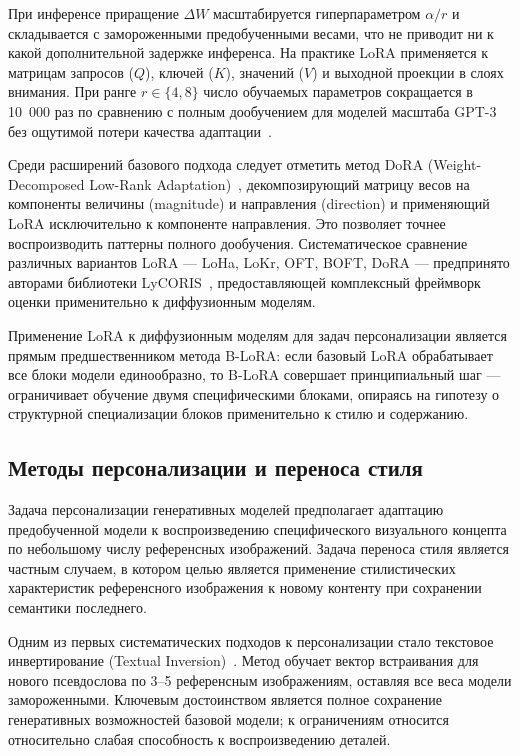 При инференсе приращение $\Delta W$ масштабируется гиперпараметром $\alpha / r$ и складывается с замороженными предобученными весами, что не приводит ни к какой дополнительной задержке инференса. На практике LoRA применяется к матрицам запросов ($Q$), ключей ($K$), значений ($V$) и выходной проекции в слоях внимания. При ранге $r \in \{4, 8\}$ число обучаемых параметров сокращается в 10~000 раз по сравнению с полным дообучением для моделей масштаба GPT-3 без ощутимой потери качества адаптации~\cite{hu2022lora}.

Среди расширений базового подхода следует отметить метод DoRA (Weight-Decomposed Low-Rank Adaptation)~\cite{liu2024dora}, декомпозирующий матрицу весов на компоненты величины (magnitude) и направления (direction) и применяющий LoRA исключительно к компоненте направления. Это позволяет точнее воспроизводить паттерны полного дообучения. Систематическое сравнение различных вариантов LoRA --- LoHa, LoKr, OFT, BOFT, DoRA --- предпринято авторами библиотеки LyCORIS~\cite{yeh2024lycoris}, предоставляющей комплексный фреймворк оценки применительно к диффузионным моделям.

Применение LoRA к диффузионным моделям для задач персонализации является прямым предшественником метода B-LoRA: если базовый LoRA обрабатывает все блоки модели единообразно, то B-LoRA совершает принципиальный шаг --- ограничивает обучение двумя специфическими блоками, опираясь на гипотезу о структурной специализации блоков применительно к стилю и содержанию.


\subsection{Методы персонализации и переноса стиля}

Задача персонализации генеративных моделей предполагает адаптацию предобученной модели к воспроизведению специфического визуального концепта по небольшому числу референсных изображений. Задача переноса стиля является частным случаем, в котором целью является применение стилистических характеристик референсного изображения к новому контенту при сохранении семантики последнего.

Одним из первых систематических подходов к персонализации стало текстовое инвертирование (Textual Inversion)~\cite{gal2023textualinversion}. Метод обучает вектор встраивания для нового псевдослова по 3--5 референсным изображениям, оставляя все веса модели замороженными. Ключевым достоинством является полное сохранение генеративных возможностей базовой модели; к ограничениям относится относительно слабая способность к воспроизведению деталей.

